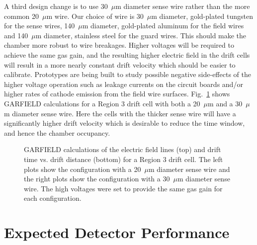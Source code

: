 A third design change is to use 30~$\mu$m diameter sense wire rather than 
the more common 20~$\mu$m wire. Our choice of wire is 30~$\mu$m diameter, 
gold-plated tungsten for the sense wires, 140~$\mu$m diameter, gold-plated 
aluminum for the field wires and 140~$\mu$m diameter, stainless steel for
the guard wires.   This should make the chamber more robust to wire 
breakages.  Higher voltages will be required to achieve the same gas gain, 
and the resulting higher electric field in the drift cells will result in 
a more nearly constant drift velocity which should be easier to calibrate.
Prototypes are being built to study possible negative side-effects of the 
higher voltage operation such as leakage currents on the circuit boards 
and/or higher rates of cathode emission from the field wire surfaces.
Fig.~\ref{garfield} shows GARFIELD calculations for a Region 3 drift cell
with both a 20~$\mu$m and a 30~$\mu$m diameter sense wire.  Here the
cells with the thicker sense wire will have a significantly higher drift 
velocity which is desirable to reduce the time window, and hence the chamber 
occupancy.

\begin{figure}[htbp]
\vspace{12.0cm}
\caption{\small{GARFIELD calculations of the electric field lines (top)
and drift time vs. drift distance (bottom) for a Region 3 drift cell.  The 
left plots show the configuration with a 20~$\mu$m diameter sense wire and 
the right plots show the configuration with a 30~$\mu$m diameter sense wire.
The high voltages were set to provide the same gas gain for each
configuration.}}
\label{garfield}
\end{figure}

\section{Expected Detector Performance}

